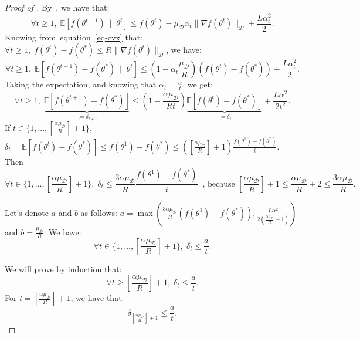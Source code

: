 \documentclass{article} %
\def\eqref#1{equation~\ref{#1}}
\begin{document}
\begin{proof}[Proof of ]
By~, we have that:
$$
    \forall t \ge 1,\; \mathbb{E}[f(\theta^{t+1})  \: \mid \; \theta^t  ]
   \le f(\theta^t) - \mu_{\mathcal{D}} \alpha_t \lVert \nabla f(\theta^t) \rVert_{\mathcal{D}} + \frac{L \alpha_t^2 }{2}.
$$
Knowing from~\eqref{eq-cvx} that: $\forall t \ge 1,\;  f(\theta^t)-f(\theta^{*}) \le R \| \nabla f(\theta^t)\|_{\mathcal{D}}$, we have:
$$\forall t \ge 1,\;  \mathbb{E}[f(\theta^{t+1})-f(\theta^{*}) \: \mid \; \theta^t  ] \le \left( 1- \alpha_t \frac{\mu_{\mathcal{D}}}{ R}  \right) \left(f(\theta^{t})-f(\theta^{*})\right)+ \frac{L  \alpha_t^2  }{2}.$$
Taking the expectation, and knowing that $\alpha_t=\frac{\alpha}{t}$, we get: 
\begin{equation}\label{eq-delta-cvx}
  \forall t \ge 1,\;   \underbrace{\mathbb{E}\left[f(\theta^{t+1})-f(\theta^{*})  \right]}_{:=\delta_{t+1}} \le \left( 1-  \frac{\alpha \mu_{\mathcal{D}}}{ R t}  \right) \underbrace{\mathbb{E}\left[f(\theta^{t})-f(\theta^{*})\right]}_{:=\delta_t}+ \frac{L  \alpha^2  }{2 t^2}.
\end{equation}
If $t \in \{1,...,[\frac{\alpha \mu_{\mathcal{D}}}{R} ]+1  \}$, $\delta_t=\mathbb{E}\left[f(\theta^{t})-f(\theta^{*})\right] \le f(\theta^1)-f(\theta^{*}) \le ([\frac{\alpha \mu_{\mathcal{D}}}{R} ]+1) \frac{ f(\theta^1)-f(\theta^{*})}{t}$. Then $$\forall t \in \{1,...,[\frac{\alpha \mu_{\mathcal{D}}}{R} ]+1  \},\; \delta_t \le \frac{3\alpha \mu_{\mathcal{D}} }{R}\frac{f(\theta^1)-f(\theta^{*})}{t}\;\; \text{, because } [\frac{\alpha \mu_{\mathcal{D}} }{R}] +1 \le  \frac{\alpha \mu_{\mathcal{D}} }{R}+2 \le \frac{3\alpha \mu_{\mathcal{D}} }{R}.$$

Let's denote $a$ and $b$ as follows:  $
a= \max \left(  \frac{3\alpha \mu_{\mathcal{D}} }{R}(f(\theta^1)-f(\theta^{*})), \frac{ L  \alpha^2  }{ 2(\frac{\alpha \mu_{\mathcal{D}}  }{R} -1)} \right)
$ and $
b=\frac{\mu_{\mathcal{D}}}{R}$. 
We have:
\begin{equation}\label{Eqrec}
    \forall  t  \in \{1,...,[\frac{\alpha \mu_{\mathcal{D}}}{R} ]+1  \}, \;  \delta_t \le \frac{ a}{t }.
\end{equation}

We will prove by induction that: 
\begin{equation*}
    \forall t \ge [\frac{\alpha \mu_{\mathcal{D}} }{R}]+1,\;   \delta_t \le \frac{ a}{t }.
\end{equation*}
For $t=[\frac{\alpha \mu_{\mathcal{D}} }{R}]+1$, we have that: $$\delta_{[\frac{\alpha \mu_{\mathcal{D}} }{R}]+1} \le  \frac{a}{t}.$$


\end{proof}
\end{document}
